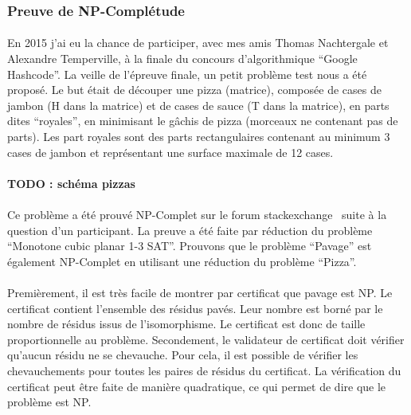 \documentclass[12pt,french,twoside]{report}
\begin{document}
\subsubsection{Preuve de NP-Complétude}

\paragraph{}En 2015 j'ai eu la chance de participer, avec mes amis Thomas Nachtergale et Alexandre Temperville, à la finale du concours d'algorithmique ``Google Hashcode''.
La veille de l'épreuve finale, un petit problème test nous a été proposé.
Le but était de découper une pizza (matrice), composée de cases de jambon (H dans la matrice) et de cases de sauce (T dans la matrice), en parts dites ``royales'', en minimisant le gâchis de pizza (morceaux ne contenant pas de parts).
Les part royales sont des parts rectangulaires contenant au minimum 3 cases de jambon et représentant une surface maximale de 12 cases.

\paragraph{TODO : schéma pizzas}

\paragraph{}Ce problème a été prouvé NP-Complet sur le forum stackexchange~\cite{de_biasi_complexity_2015} suite à la question d'un participant.
La preuve a été faite par réduction du problème ``Monotone cubic planar 1-3 SAT''.
Prouvons que le problème ``Pavage'' est également NP-Complet en utilisant une réduction du problème ``Pizza''.

\paragraph{}Premièrement, il est très facile de montrer par certificat que pavage est NP.
Le certificat contient l'ensemble des résidus pavés.
Leur nombre est borné par le nombre de résidus issus de l'isomorphisme.
Le certificat est donc de taille proportionnelle au problème.
Secondement, le validateur de certificat doit vérifier qu'aucun résidu ne se chevauche.
Pour cela, il est possible de vérifier les chevauchements pour toutes les paires de résidus du certificat.
La vérification du certificat peut être faite de manière quadratique, ce qui permet de dire que le problème est NP.
\end{document}
